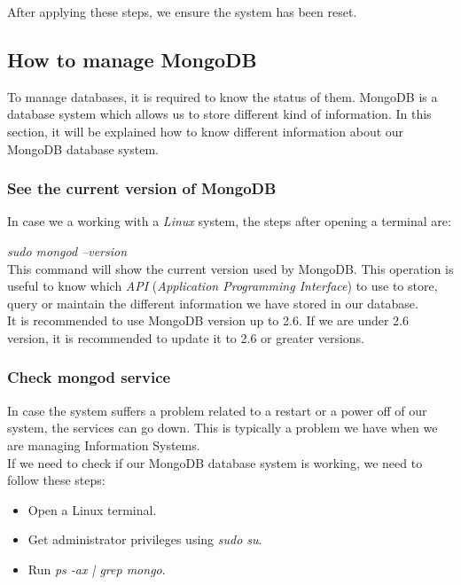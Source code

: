 After applying these steps, we ensure the system has been reset.\\

\subsection{How to manage MongoDB}

To manage databases, it is required to know the status of them. MongoDB is a database system which allows us to store different kind of information. In this section, it will be explained how to know different information about our MongoDB database system.

\subsubsection{See the current version of MongoDB}

In case we a working with a \textit{Linux} system, the steps after opening a terminal are:

\textit{sudo mongod –version}\\

This command will show the current version used by MongoDB. This operation is useful to know which \textit{API}\cite{what_is_an_API} (\textit{Application Programming Interface}) to use to store, query or maintain the different information we have stored in our database.\\

It is recommended to use MongoDB version up to 2.6. If we are under 2.6 version, it is recommended to update it to 2.6 or greater versions.

\subsubsection{Check mongod service}

In case the system suffers a problem related to a restart or a power off of our system, the services can go down. This is typically a problem we have when we are managing Information Systems.\\

If we need to check if our MongoDB database system is working, we need to follow these steps:

\begin{itemize}
\item Open a Linux terminal.
\item Get administrator privileges using \textit{sudo su}.
\item Run \textit{ps -ax | grep mongo}.
\end{itemize}


